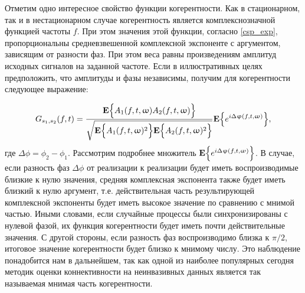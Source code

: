 Отметим одно интересное свойство функции когерентности.
Как в стационарном, так и в нестационарном случае когерентность является комплекснозначной функцией
частоты $f$. При этом значения этой функции, согласно \ref{csp_exp}, пропорциональны
средневзвешенной комплексной экспоненте с аргументом, зависящим от разности фаз.
При этом веса равны произведениям амплитуд исходных сигналов на заданной частоте.
Если в иллюстративных целях предположить, что амплитуды и фазы независимы, получим для когерентности следующее выражение:

\begin{equation}
    G_{s_1,s_2}(f,t) =
    \frac{\mathbf{E}\Big\{A_1(f,t,\upomega)A_2(f,t,\upomega)\Big\}}
    {\sqrt{\mathbf{E}\Big\{A_1(f,t,\upomega)^2\Big\}\mathbf{E}\Big\{A_2(f,t,\upomega)^2\Big\}}}\mathbf{E}\Big\{e^{i\Delta\upvarphi(f,t,\upomega)}\Big\},
\end{equation}
где $\Delta\phi = \phi_2 - \phi_1$. Рассмотрим подробнее множитель $\mathbf{E}\Big\{e^{i\Delta\upvarphi(f,t,\upomega)}\Big\}$.
В случае, если разность фаз $\Delta\phi$ от реализации к реализации будет иметь воспроизводимые близкие к нулю значения,
средняя комплексная экспонента также будет иметь близкий к нулю аргумент, т.е. действительная часть результирующей
комплексной экспоненты будет иметь высокое значение по сравнению с мнимой частью.
Иными словами, если случайные процессы были синхронизированы с нулевой фазой, их функция когерентности
будет иметь почти действительные значения. С другой стороны, если разность фаз воспроизводимо близка к $\pi/2$,
итоговое значение когерентности будет близко к мнимому числу.
Это наблюдение понадобится нам в дальнейшем, так как одной из наиболее популярных сегодня методик оценки
коннективности на неинвазивных данных является так называемая мнимая часть когерентности.





